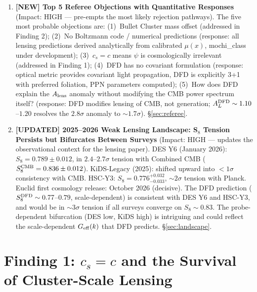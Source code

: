 \documentclass[11pt,a4paper]{article}
\begin{document}
\begin{tcolorbox}[colback=yellow!5!white, colframe=red!70!black,
  title=\textbf{TOP 5 FINDINGS --- WAVE 4, ITERATION 19}]
\begin{enumerate}
\item \textbf{[NEW] Top 5 Referee Objections with Quantitative Responses}
  (Impact: HIGH --- pre-empts the most likely rejection pathways).
  The five most probable objections are: (1)~Bullet Cluster mass offset
  (addressed in Finding 2); (2)~No Boltzmann code / numerical predictions
  (response: all lensing predictions derived analytically from calibrated
  $\mu(x)$, mochi\_class under development); (3)~$c_s = c$ means
  $\psi$ is cosmologically irrelevant (addressed in Finding 1);
  (4)~DFD has no covariant formulation (response: optical metric
  provides covariant light propagation, DFD is explicitly 3+1 with
  preferred foliation, PPN parameters computed); (5)~How does DFD explain
  the $A_{\rm lens}$ anomaly without modifying the CMB power spectrum
  itself? (response: DFD modifies lensing of CMB, not generation;
  $A_L^{\rm DFD} \sim 1.10$--$1.20$ resolves the $2.8\sigma$ anomaly
  to $\sim 1.7\sigma$).  \S\ref{sec:referee}.

\item \textbf{[UPDATED] 2025--2026 Weak Lensing Landscape: S$_8$
  Tension Persists but Bifurcates Between Surveys} (Impact: HIGH ---
  updates the observational context for the lensing paper).
  DES Y6 (January 2026): $S_8 = 0.789 \pm 0.012$, in $2.4$--$2.7\sigma$
  tension with Combined CMB ($S_8^{\rm CMB} = 0.836 \pm 0.012$).
  KiDS-Legacy (2025): shifted upward into $< 1\sigma$ consistency
  with CMB.  HSC-Y3: $S_8 = 0.776^{+0.032}_{-0.033}$, $\sim 2\sigma$
  tension with Planck.  Euclid first cosmology release: October 2026
  (decisive).  The DFD prediction ($S_8^{\rm DFD} \sim 0.77$--$0.79$,
  scale-dependent) is consistent with DES Y6 and HSC-Y3, and would be
  in $\sim 3\sigma$ tension if all surveys converge on $S_8 \sim 0.83$.
  The probe-dependent bifurcation (DES low, KiDS high) is intriguing
  and could reflect the scale-dependent $G_{\rm eff}(k)$ that DFD
  predicts.  \S\ref{sec:landscape}.

\end{enumerate}

\end{tcolorbox}


\section{Finding 1: $c_s = c$ and the Survival of Cluster-Scale Lensing}
\label{sec:cs-lensing}
\end{document}

